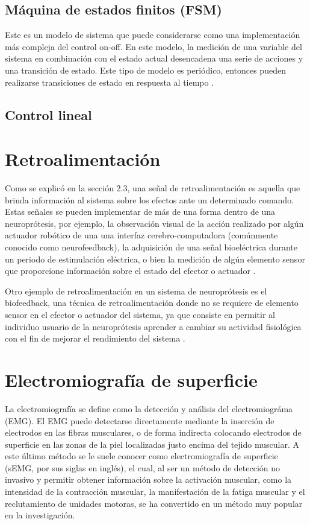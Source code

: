 \subsection{Máquina de estados finitos (FSM)}
Este es un modelo de sistema que puede considerarse como una implementación más compleja del control on-off. En este modelo, la medición de una variable del sistema en combinación con el estado actual desencadena una serie de acciones y una transición de estado. Este tipo de modelo es periódico, entonces pueden realizarse transiciones de estado en respuesta al tiempo \cite{Wright2016}.

{\color{red}\subsection{Control lineal}}


\section{Retroalimentación}
Como se explicó en la sección 2.3, una señal de retroalimentación es aquella que brinda información al sistema sobre los efectos ante un determinado comando. Estas señales se pueden implementar de más de una forma dentro de una neuroprótesis, por ejemplo, la observación visual de la acción realizado por algún actuador robótico de una una interfaz cerebro-computadora (comúnmente conocido como neurofeedback), la adquisición de una señal bioeléctrica durante un periodo de estimulación eléctrica, o bien la medición de algún elemento sensor que proporcione información sobre el estado del efector o actuador \cite{Wright2016}.

Otro ejemplo de retroalimentación en un sistema de neuroprótesis es el biofeedback, una técnica de retroalimentación donde no se requiere de elemento sensor en el efector o actuador del sistema, ya que consiste en permitir al individuo usuario de la neuroprótesis aprender a cambiar su actividad fisiológica con el fin de mejorar el rendimiento del sistema \cite{Yucha2008}.

\section{Electromiografía de superficie}
La electromiografía se define como la detección y análisis del electromiográma (EMG). El EMG puede detectarse directamente mediante la inserción de electrodos en las fibras musculares, o de forma indirecta colocando electrodos de superficie en las zonas de la piel localizadas justo encima del tejido muscular. A este último método se le suele conocer como electromiografía de superficie (sEMG, por sus siglas en inglés), el cual, al ser un método de detección no invasivo y permitir obtener información sobre la activación muscular, como la intensidad de la contracción muscular, la manifestación de la fatiga muscular y el reclutamiento de unidades motoras, se ha convertido en un método muy popular en la investigación.


